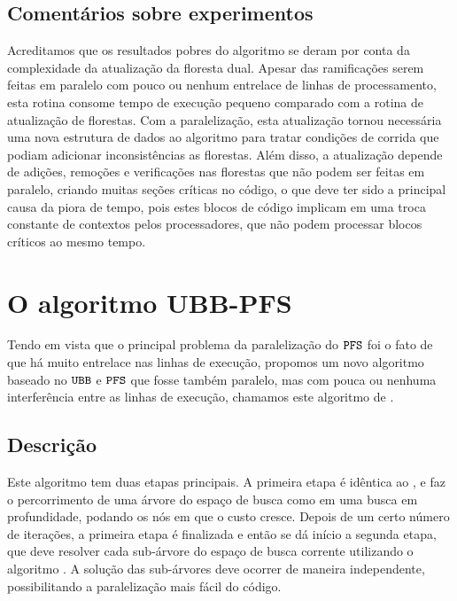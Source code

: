 \subsection{Comentários sobre experimentos}
Acreditamos que os resultados pobres do algoritmo  se 
deram por conta da complexidade da atualização da floresta dual. 
Apesar das ramificações serem feitas em paralelo com pouco ou nenhum
entrelace de linhas de processamento, esta rotina consome tempo de
execução pequeno comparado com a rotina de atualização de florestas.
Com a paralelização, esta atualização tornou necessária uma nova 
estrutura de dados ao algoritmo para tratar condições de corrida 
que podiam adicionar inconsistências as florestas. Além disso, a 
atualização depende de adições, remoções e verificações nas 
florestas que não podem ser feitas em paralelo, criando muitas seções
críticas no código, o que deve ter sido a principal causa da piora
de tempo, pois estes blocos de código implicam em uma troca constante
de contextos pelos processadores, que não podem processar blocos
críticos ao mesmo tempo.

\section{O algoritmo UBB-PFS}
\label{sec:ubbpfs}
Tendo em vista que o principal problema da paralelização do 
$\texttt{PFS}$ foi o fato de que há muito entrelace nas linhas de 
execução, propomos um novo algoritmo baseado no $\texttt{UBB}$ e 
$\texttt{PFS}$ que fosse também paralelo, mas com pouca ou nenhuma 
interferência entre as linhas de execução, chamamos este algoritmo de 
.

\subsection{Descrição}
Este algoritmo tem duas etapas principais. A primeira etapa é idêntica
ao , e faz o percorrimento de uma árvore do espaço de busca
como em uma busca em profundidade, podando os nós em que o custo cresce.
Depois de um certo número de iterações, a primeira etapa é finalizada e 
então se dá início a segunda etapa, que deve resolver cada sub-árvore 
do espaço de busca corrente utilizando o algoritmo . A 
solução das sub-árvores deve ocorrer de maneira independente, 
possibilitando a paralelização mais fácil do código.

